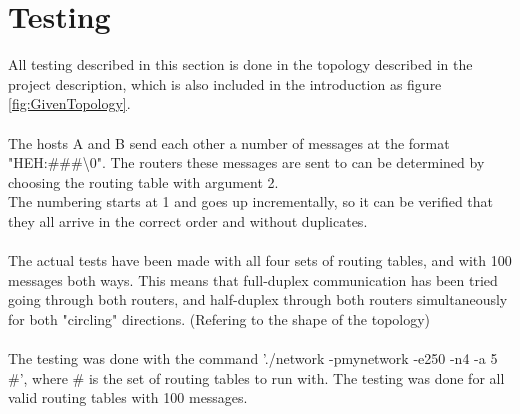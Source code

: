 \section{Testing}
All testing described in this section is done in the topology described in the project description, which is also included in the introduction as figure \ref{fig:GivenTopology}.\\
\\
The hosts A and B send each other a number of messages at the format "HEH:\#\#\#\textbackslash0". The routers these messages are sent to can be determined by choosing the routing table with argument 2.\\
The numbering starts at 1 and goes up incrementally, so it can be verified that they all arrive in the correct order and without duplicates.\\
\\
The actual tests have been made with all four sets of routing tables, and with 100 messages both ways. This means that full-duplex communication has been tried going through both routers, and half-duplex through both routers simultaneously for both "circling" directions. (Refering to the shape of the topology)\\
\\
The testing was done with the command './network -pmynetwork -e250 -n4 -a 5 \#', where \# is the set of routing tables to run with. The testing was done for all valid routing tables with 100 messages.\\
\\
